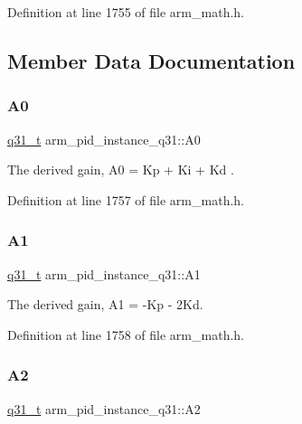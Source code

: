 Definition at line 1755 of file arm\+\_\+math.\+h.



\subsection{Member Data Documentation}
\mbox{\label{structarm__pid__instance__q31_aa5332635ce9c7078cdb4c1ecf442eadd}} 
\subsubsection{\texorpdfstring{A0}{A0}}
{\footnotesize\ttfamily \hyperlink{arm__math_8h_adc89a3547f5324b7b3b95adec3806bc0}{q31\+\_\+t} arm\+\_\+pid\+\_\+instance\+\_\+q31\+::\+A0}

The derived gain, A0 = Kp + Ki + Kd . 

Definition at line 1757 of file arm\+\_\+math.\+h.

\mbox{\label{structarm__pid__instance__q31_a2f7492bd6fb92fae5e2de7fbbec39b0e}} 
\subsubsection{\texorpdfstring{A1}{A1}}
{\footnotesize\ttfamily \hyperlink{arm__math_8h_adc89a3547f5324b7b3b95adec3806bc0}{q31\+\_\+t} arm\+\_\+pid\+\_\+instance\+\_\+q31\+::\+A1}

The derived gain, A1 = -\/\+Kp -\/ 2\+Kd. 

Definition at line 1758 of file arm\+\_\+math.\+h.

\mbox{\label{structarm__pid__instance__q31_a3e34537c53af4f9ad7bfffa4dff27c82}} 
\subsubsection{\texorpdfstring{A2}{A2}}
{\footnotesize\ttfamily \hyperlink{arm__math_8h_adc89a3547f5324b7b3b95adec3806bc0}{q31\+\_\+t} arm\+\_\+pid\+\_\+instance\+\_\+q31\+::\+A2}

